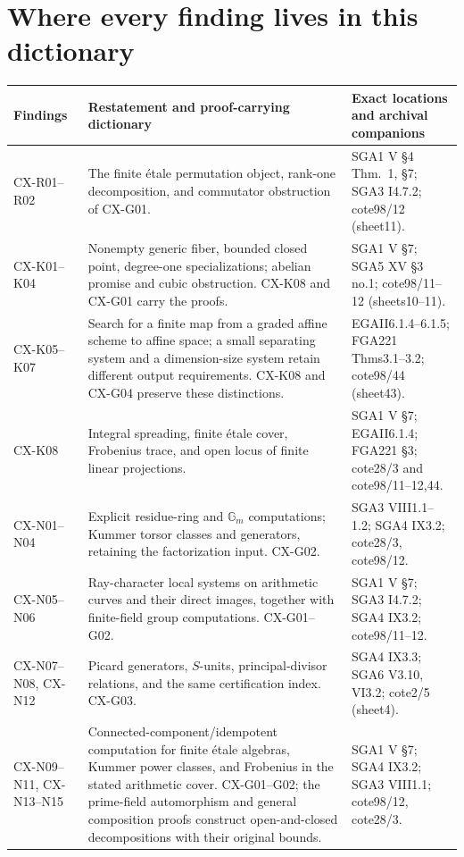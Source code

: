 \documentclass[11pt,a4paper]{article}
\begin{document}
\section{Where every finding lives in this dictionary}
\label{sec:crosswalk}

\begin{longtable}{@{}p{}p{}p{}@{}}
\toprule
Findings & Restatement and proof-carrying dictionary & Exact locations and archival companions\\
\midrule
\endhead
CX-R01--R02 & The finite étale permutation object, rank-one decomposition, and commutator obstruction of CX-G01. & SGA1 V \S4 Thm.~1, \S7; SGA3 I4.7.2; cote98/12 (sheet11).\\
CX-K01--K04 & Nonempty generic fiber, bounded closed point, degree-one specializations; abelian promise and cubic obstruction. CX-K08 and CX-G01 carry the proofs. & SGA1 V \S7; SGA5 XV \S3 no.1; cote98/11--12 (sheets10--11).\\
CX-K05--K07 & Search for a finite map from a graded affine scheme to affine space; a small separating system and a dimension-size system retain different output requirements. CX-K08 and CX-G04 preserve these distinctions. & EGAII6.1.4--6.1.5; FGA221 Thms3.1--3.2; cote98/44 (sheet43).\\
CX-K08 & Integral spreading, finite étale cover, Frobenius trace, and open locus of finite linear projections. & SGA1 V \S7; EGAII6.1.4; FGA221 \S3; cote28/3 and cote98/11--12,44.\\
CX-N01--N04 & Explicit residue-ring and $\mathbb G_m$ computations; Kummer torsor classes and generators, retaining the factorization input. CX-G02. & SGA3 VIII1.1--1.2; SGA4 IX3.2; cote28/3, cote98/12.\\
CX-N05--N06 & Ray-character local systems on arithmetic curves and their direct images, together with finite-field group computations. CX-G01--G02. & SGA1 V \S7; SGA3 I4.7.2; SGA4 IX3.2; cote98/11--12.\\
CX-N07--N08, CX-N12 & Picard generators, $S$-units, principal-divisor relations, and the same certification index. CX-G03. & SGA4 IX3.3; SGA6 V3.10, VI3.2; cote2/5 (sheet4).\\
CX-N09--N11, CX-N13--N15 & Connected-component/idempotent computation for finite étale algebras, Kummer power classes, and Frobenius in the stated arithmetic cover. CX-G01--G02; the prime-field automorphism and general composition proofs construct open-and-closed decompositions with their original bounds. & SGA1 V \S7; SGA4 IX3.2; SGA3 VIII1.1; cote98/12, cote28/3.\\

\end{longtable}
\end{document}
